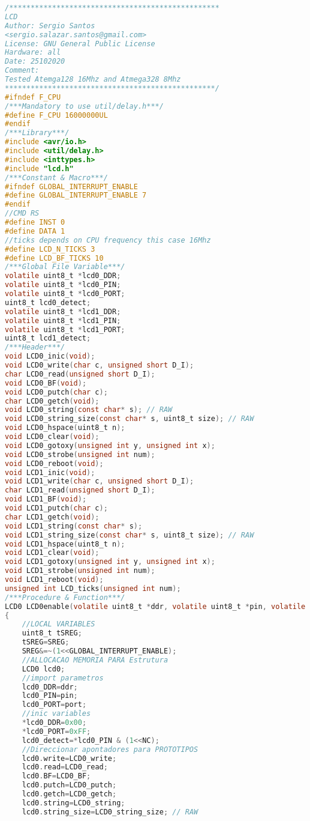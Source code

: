 \begin{lstlisting}[language=C, caption={lcd.c}, label=lcd-c, captionpos=b]
/*************************************************
LCD
Author: Sergio Santos 
<sergio.salazar.santos@gmail.com>
License: GNU General Public License
Hardware: all
Date: 25102020
Comment:
Tested Atemga128 16Mhz and Atmega328 8Mhz                    
*************************************************/
#ifndef F_CPU
/***Mandatory to use util/delay.h***/
#define F_CPU 16000000UL
#endif
/***Library***/
#include <avr/io.h>
#include <util/delay.h>
#include <inttypes.h>
#include "lcd.h"
/***Constant & Macro***/
#ifndef GLOBAL_INTERRUPT_ENABLE
#define GLOBAL_INTERRUPT_ENABLE 7
#endif
//CMD RS
#define INST 0
#define DATA 1
//ticks depends on CPU frequency this case 16Mhz
#define LCD_N_TICKS 3
#define LCD_BF_TICKS 10
/***Global File Variable***/
volatile uint8_t *lcd0_DDR;
volatile uint8_t *lcd0_PIN;
volatile uint8_t *lcd0_PORT;
uint8_t lcd0_detect;
volatile uint8_t *lcd1_DDR;
volatile uint8_t *lcd1_PIN;
volatile uint8_t *lcd1_PORT;
uint8_t lcd1_detect;
/***Header***/
void LCD0_inic(void);
void LCD0_write(char c, unsigned short D_I);
char LCD0_read(unsigned short D_I);
void LCD0_BF(void);
void LCD0_putch(char c);
char LCD0_getch(void);
void LCD0_string(const char* s); // RAW
void LCD0_string_size(const char* s, uint8_t size); // RAW
void LCD0_hspace(uint8_t n);
void LCD0_clear(void);
void LCD0_gotoxy(unsigned int y, unsigned int x);
void LCD0_strobe(unsigned int num);
void LCD0_reboot(void);
void LCD1_inic(void);
void LCD1_write(char c, unsigned short D_I);
char LCD1_read(unsigned short D_I);
void LCD1_BF(void);
void LCD1_putch(char c);
char LCD1_getch(void);
void LCD1_string(const char* s);
void LCD1_string_size(const char* s, uint8_t size); // RAW
void LCD1_hspace(uint8_t n);
void LCD1_clear(void);
void LCD1_gotoxy(unsigned int y, unsigned int x);
void LCD1_strobe(unsigned int num);
void LCD1_reboot(void);
unsigned int LCD_ticks(unsigned int num);
/***Procedure & Function***/
LCD0 LCD0enable(volatile uint8_t *ddr, volatile uint8_t *pin, volatile uint8_t *port)
{
	//LOCAL VARIABLES
	uint8_t tSREG;
	tSREG=SREG;
	SREG&=~(1<<GLOBAL_INTERRUPT_ENABLE);
	//ALLOCACAO MEMORIA PARA Estrutura
	LCD0 lcd0;
	//import parametros
	lcd0_DDR=ddr;
	lcd0_PIN=pin;
	lcd0_PORT=port;
	//inic variables
	*lcd0_DDR=0x00;
	*lcd0_PORT=0xFF;
	lcd0_detect=*lcd0_PIN & (1<<NC);
	//Direccionar apontadores para PROTOTIPOS
	lcd0.write=LCD0_write;
	lcd0.read=LCD0_read;
	lcd0.BF=LCD0_BF;
	lcd0.putch=LCD0_putch;
	lcd0.getch=LCD0_getch;
	lcd0.string=LCD0_string;
	lcd0.string_size=LCD0_string_size; // RAW

\end{lstlisting}
